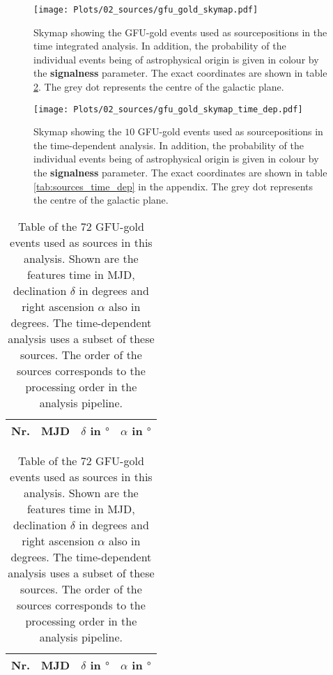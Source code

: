 \begin{figure}
    \centering
    \texttt{[image: Plots/02\_sources/gfu\_gold\_skymap.pdf]}
    \label{fig:skymap_1}
    \caption{Skymap showing the GFU-gold events used as sourcepositions in the time integrated analysis. In addition, the probability of the individual events being of astrophysical origin is given in colour by the \textbf{signalness} parameter. The exact coordinates are shown in table \ref{tab:sources}. The grey dot represents the centre of the galactic plane.}
\end{figure}

\begin{figure}
    \centering
    \texttt{[image: Plots/02\_sources/gfu\_gold\_skymap\_time\_dep.pdf]}
    \label{fig:skymap_2}
    \caption{Skymap showing the $\num{10}$ GFU-gold events used as sourcepositions in the time-dependent analysis. In addition, the probability of the individual events being of astrophysical origin is given in colour by the \textbf{signalness} parameter. The exact coordinates are shown in table \ref{tab:sources_time_dep} in the appendix. The grey dot represents the centre of the galactic plane.}
\end{figure}

\begin{table}[!htb]
  \caption{Table of the $\num{72}$ GFU-gold events used as sources in this analysis. Shown are the features time in MJD, declination $\delta$ in degrees and right ascension $\alpha$ also in degrees. The time-dependent analysis uses a subset of these sources. The order of the sources corresponds to the processing order in the analysis pipeline.}
  \label{tab:sources}
  \begin{subtable}{.5\linewidth}
  \centering
  \begin{tabular}{ccrr}
    \toprule
    Nr. & MJD &  $\delta$ in $\si{\degree}$ & $\alpha$ in $\si{\degree}$ \\
    \toprule
    
    \toprule
  \end{tabular}
\end{subtable}
\begin{subtable}{.5\linewidth}
\centering
  \begin{tabular}{ccrr}
    \toprule
    Nr. & MJD &  $\delta$ in $\si{\degree}$ & $\alpha$ in $\si{\degree}$ \\
    \toprule
    
    \toprule
  \end{tabular}
  \end{subtable}
\end{table}
